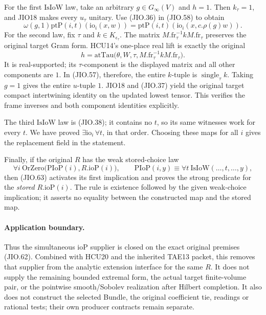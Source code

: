 For the first \(\mathrm{IsIoW}\) law, take an arbitrary
\(g\in G_\infty(V)\) and \(h=1\).
Then \(k_\tau=1\), and JIO18 makes every \(u_\tau\) unitary.
Use (JIO.36) in (JIO.58) to obtain
\[
 \omega(g,1)\mathrm{ptP}(i,t)(\mathrm{io}_i(x,w))
       =\mathrm{ptP}(i,t)(\mathrm{io}_i(x,c.\rho(g)w)).
 \tag{JIO.65}
\]
For the second law, fix \(\tau\) and \(k\in K_{\epsilon_\tau}\).
The matrix \(M.\mathrm{fr}_\tau^{-1}kM.\mathrm{fr}_\tau\)
preserves the original target Gram form.  HCU14's one-place
real lift is exactly the original
\[
 h=\mathrm{atTau}\bigl(\theta,W,\tau,
                M.\mathrm{fr}_\tau^{-1}kM.\mathrm{fr}_\tau\bigr).
 \tag{JIO.66}
\]
It is real-supported; its \(\tau\)-component is the displayed
matrix and all other components are \(1\).
In (JIO.57), therefore, the entire \(k\)-tuple is
\(\operatorname{single}_\tau k\).  Taking \(g=1\) gives
the entire \(u\)-tuple \(1\).
JIO18 and (JIO.37) yield the original target compact
intertwining identity on the updated lowest tensor.
This verifies the frame inverses and both component
identities explicitly.

The third \(\mathrm{IsIoW}\) law is (JIO.38); it contains
no \(t\), so its same witnesses work for every \(t\).
We have proved \(\exists\mathrm{io}_i\,\forall t\), in that
order.  Choosing these maps for all \(i\) gives the
replacement field in the statement.

Finally, if the original \(R\) has the weak stored-choice
law
\[
 \forall i\ \mathrm{OrZero}\bigl(
       \mathrm{PIoP}(i),R.\mathrm{ioP}(i)\bigr),\qquad
            \mathrm{PIoP}(i,y)\equiv\forall t\
                            \mathrm{IsIoW}(\ldots,t,\ldots,y),
 \tag{JIO.67}
\]
then (JIO.63) activates its first implication and proves
the strong predicate for the \emph{stored} \(R.\mathrm{ioP}(i)\).
The rule is existence followed by the given weak-choice
implication; it asserts no equality between the constructed
map and the stored map.

\paragraph{Application boundary.}
Thus the simultaneous \(\mathrm{ioP}\) supplier is closed on
the exact original premises (JIO.62).  Combined with HCU20
and the inherited TAE13 packet, this removes that supplier
from the analytic extension interface for the same \(R\).
It does not supply the remaining bounded extremal form,
the actual target finite-volume pair, or the pointwise
smooth/Sobolev realization after Hilbert completion.
It also does not construct the selected Bundle, the original
coefficient tie, readings or rational tests; their own
producer contracts remain separate.
